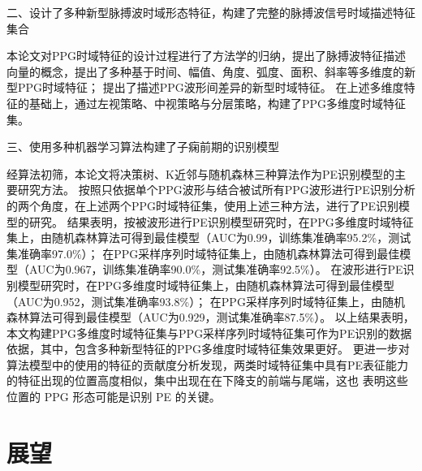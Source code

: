 二、设计了多种新型脉搏波时域形态特征，构建了完整的脉搏波信号时域描述特征集合

本论文对PPG时域特征的设计过程进行了方法学的归纳，提出了脉搏波特征描述向量的概念，提出了多种基于时间、幅值、角度、弧度、面积、斜率等多维度的新型PPG时域特征；
提出了描述PPG波形间差异的新型时域特征。
在上述多维度特征的基础上，通过左视策略、中视策略与分层策略，构建了PPG多维度时域特征集。


三、使用多种机器学习算法构建了子痫前期的识别模型

经算法初筛，本论文将决策树、K近邻与随机森林三种算法作为PE识别模型的主要研究方法。
按照只依据单个PPG波形与结合被试所有PPG波形进行PE识别分析的两个角度，在上述两个PPG时域特征集，使用上述三种方法，进行了PE识别模型的研究。
结果表明，按被波形进行PE识别模型研究时，在PPG多维度时域特征集上，由随机森林算法可得到最佳模型（AUC为0.99，训练集准确率95.2\%，测试集准确率97.0\%）；
在PPG采样序列时域特征集上，由随机森林算法可得到最佳模型（AUC为0.967，训练集准确率90.0\%，测试集准确率92.5\%）。
在波形进行PE识别模型研究时，在PPG多维度时域特征集上，由随机森林算法可得到最佳模型（AUC为0.952，测试集准确率93.8\%）；
在PPG采样序列时域特征集上，由随机森林算法可得到最佳模型（AUC为0.929，测试集准确率87.5\%）。
以上结果表明，本文构建PPG多维度时域特征集与PPG采样序列时域特征集可作为PE识别的数据依据，其中，包含多种新型特征的PPG多维度时域特征集效果更好。
更进一步对算法模型中的使用的特征的贡献度分析发现，两类时域特征集中具有PE表征能力的特征出现的位置高度相似，集中出现在在下降支的前端与尾端，这也
表明这些位置的 PPG 形态可能是识别 PE 的关键。


\section{展望}

